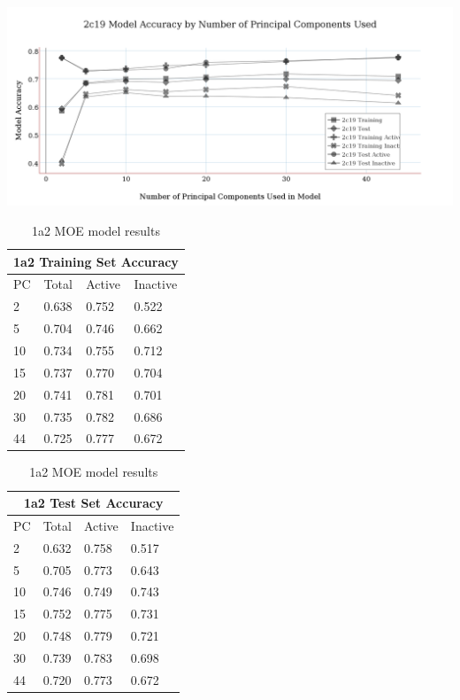 \includegraphics[width=1\textwidth]{../img/2c19_moe_model_accuracy.png}

\begin{table}[h]
\begin{minipage}{.5\linewidth}
\centering
\begin{tabular}{|l|l|l|l|}
\hline
\multicolumn{4}{|c|}{1a2 Training Set Accuracy}   \\ \hline
PC & Total          & Active          & Inactive  \\ \hline
2  & 0.638          & 0.752           & 0.522     \\ \hline
5  & 0.704          & 0.746           & 0.662     \\ \hline
10 & 0.734          & 0.755           & 0.712     \\ \hline
15 & 0.737          & 0.770           & 0.704     \\ \hline
20 & 0.741          & 0.781           & 0.701     \\ \hline
30 & 0.735          & 0.782           & 0.686     \\ \hline
44 & 0.725          & 0.777           & 0.672     \\ \hline
\end{tabular}
\end{minipage}
\begin{minipage}{.5\linewidth}
\centering
\begin{tabular}{|l|l|l|l|}
\hline
\multicolumn{4}{|c|}{1a2 Test Set Accuracy}     \\ \hline
PC & Total          & Active          & Inactive \\ \hline
2  & 0.632          & 0.758           & 0.517   \\ \hline
5  & 0.705          & 0.773           & 0.643   \\ \hline
10 & 0.746          & 0.749           & 0.743   \\ \hline
15 & 0.752          & 0.775           & 0.731   \\ \hline
20 & 0.748          & 0.779           & 0.721   \\ \hline
30 & 0.739          & 0.783           & 0.698   \\ \hline
44 & 0.720          & 0.773           & 0.672   \\ \hline
\end{tabular}
\end{minipage}
\caption{1a2 MOE model results}
\end{table}

